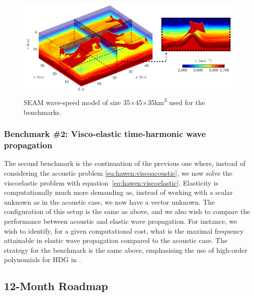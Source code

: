 \begin{figure}[ht!]\centering
\includegraphics[scale=0.65]{graphics/hawen/skeleton_3D_seam}
\caption{SEAM wave-speed model of size \num{35}$\times$\num{45}$\times$\num{35}\si{\km\cubed} 
         used for the benchmarks.}
\label{figure:hawen:seam-model}
\end{figure}


\subsubsection{Benchmark \#2: Visco-elastic time-harmonic wave propagation}

The second benchmark is the continuation of the previous one where, instead 
of considering the acoustic problem \cref{eq:hawen:viscoacoustic}, we now
solve the viscoelastic problem with equation~\cref{eq:hawen:viscoelastic}.
Elasticity is computationally much more demanding as, instead of working with
a scalar unknown as in the acoustic case, we now have a vector unknown. 
The configuration of this setup is the same as above, and we also wish to 
compare the performance between acoustic and elastic wave propagation. 
For instance, we wish to identify, for a given computational cost, what 
is the maximal frequency attainable in elastic wave propagation compared to
the acoustic case.
The strategy for the benchmark is the same above, emphasising the use of 
high-order polynomials for HDG in \hawen.


\subsection{12-Month Roadmap}
\label{sec:WP1:Hawen:roadmap}



